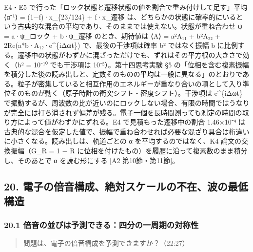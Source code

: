 \documentclass[
  a4paper,
]{ltjsarticle}
\begin{document}
E4・E5 で行った「ロック状態と遷移状態の値を割合で重み付けして足す」平均
⟨α⁻¹⟩ = (1−f)·x\_\{23/124\} + f·x\_遷移
は、どちらかの状態に確率的にいるという古典的な混合の平均であり、そのままでは使えない。状態が重ね合わせ
ψ = a·ψ\_ロック + b·ψ\_遷移 のとき、期待値は ⟨A⟩ =
\textbar a\textbar²A₁₁ + \textbar b\textbar²A₂₂ +
2Re(a*b·A₁₂·e\^{}\{iΔωt\}) で、最後の干渉項は確率 \textbar b\textbar²
ではなく振幅 b
に比例する。遷移中の状態がわずかに混ざっただけでも、ずれはその平方根の大きさで効く（\textbar b\textbar²
= 10⁻¹⁰ でも干渉項は 10⁻⁵）。第十四思考実験 §5
の「位相を含む複素振幅を積分した後の読み出しと、定数そのものの平均は一般に異なる」のとおりである。粒子が密集していると相互作用のエネルギーが重なり合いの項として入り準位そのものが動く（原子時計の衝突シフト・密度シフト）。干渉項は
e\^{}\{iΔωt\}
で振動するが、周波数の比が近いのにロックしない場合、有限の時間ではうなりが完全には打ち消されず偏差が残る。電子一個を長時間測っても測定の時間の取り方によって値がわずかにずれる。E4
で見積もった遷移中の割合 1.46×10⁻⁴
は古典的な混合を仮定した値で、振幅で重ね合わせれば必要な混ざり具合は桁違いに小さくなる。読み出しは、軌道ごとの
α を平均するのではなく、K4 論文の交換振幅（G\_R = 1 − R
に位相を付けたもの）を履歴に沿って複素数のまま積分し、そのあとで α
を読む形にする {[}A2 第10節・第11節{]}。

\subsection{20.
電子の倍音構成、絶対スケールの不在、波の最低構造}\label{ux96fbux5b50ux306eux500dux97f3ux69cbux6210ux7d76ux5bfeux30b9ux30b1ux30fcux30ebux306eux4e0dux5728ux6ce2ux306eux6700ux4f4eux69cbux9020}

\subsubsection{20.1
倍音の並びは予測できる：四分の一周期の対称性}\label{ux500dux97f3ux306eux4e26ux3073ux306fux4e88ux6e2cux3067ux304dux308bux56dbux5206ux306eux4e00ux5468ux671fux306eux5bfeux79f0ux6027}

\begin{quote}
問題は、電子の倍音構成を予測できますか？（22:27）
\end{quote}
\end{document}
